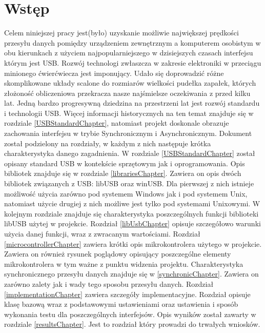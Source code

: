 \documentclass{BscUS}
\begin{document}
\chapter{Wstęp}
\label{beginChapter}
\pagestyle{fancy}
Celem niniejszej pracy jest(było) uzyskanie możliwie największej prędkości przesyłu danych pomiędzy urządzeniem zewnętrznym a komputerem osobistym w obu kierunkach z użyciem najpopularniejszego w dzisiejszych czasach interfejsu którym jest USB. Rozwój technologi zwłaszcza w zakresie elektroniki w przeciągu minionego ćwierćwiecza jest imponujący. Udało się doprowadzić różne skomplikowane układy scalone do rozmiarów wielkości pudełka zapałek, których złożoność obliczeniowa przekracza nasze najśmielsze oczekiwania z przed kilku lat. Jedną bardzo progresywną dziedzina na przestrzeni lat jest rozwój standardu i technologii USB. Więcej informacji historycznych na ten temat znajduje się w rozdziale \ref{USBStandardChapter}, natomiast projekt doskonale obrazuje zachowania interfejsu w trybie Synchronicznym i Asynchronicznym.
\newline
\indent Dokument został podzielony na rozdziały, w każdym z nich następuje krótka charakterystyka danego zagadnienia. W rozdziale \ref{USBStandardChapter} został opisany standard USB w kontekście sprzętowym jak i oprogramowania.
\newline
\indent Opis bibliotek znajduje się w rozdziale \ref{librariesChapter}. Zawiera on opis dwóch bibliotek związanych z USB: libUSB oraz winUSB. Dla pierwszej z nich istnieje możliwość użycia zarówno pod systemem Windows jak i pod systemem Unix, natomiast użycie drugiej z nich możliwe jest tylko pod systemami Unixowymi.
\newline
\indent W kolejnym rozdziale znajduje się charakterystyka poszczególnych funkcji biblioteki libUSB użytej w projekcie. Rozdział \ref{libUsbChapter} opisuje szczegółowo warunki użycia danej funkcji, wraz z zwracanym wartościami. 
\newline
\indent Rozdział \ref{microcontrollerChapter} zawiera krótki opis mikrokontrolera użytego w projekcie. Zawiera on również rysunek poglądowy opisujący poszczególne elementy mikrokontrolera w tym ważne z punktu widzenia projektu.
\newline
\indent Charakterystyka synchronicznego przesyłu danych znajduje się w \ref{synchronicChapter}. Zawiera on zarówno zalety jak i wady tego sposobu przesyłu danych.
\newline
\indent Rozdział \ref{implementationChapter} zawiera szczegóły implementacyjne. Rozdział opisuje klasę bazową wraz z podstawowymi ustawieniami oraz ustawienia i sposób wykonania testu dla poszczególnych interfejsów.
\newline
\indent Opis wyników został zawarty w rozdziale \ref{resultsChapter}. Jest to rozdział który prowadzi do trwałych wniosków.
\end{document}
